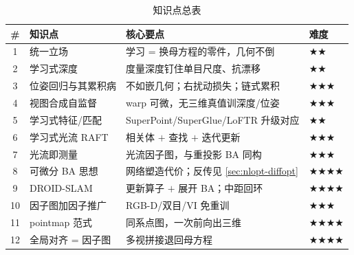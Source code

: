 \begin{table}[H]\centering\small
\caption{知识点总表}
\begin{tabular}{clll}
\toprule
\# & 知识点 & 核心要点 & 难度 \\
\midrule
1 & 统一立场 & 学习 = 换母方程的零件，几何不倒 & $\bigstar\bigstar$ \\
2 & 学习式深度 & 度量深度钉住单目尺度、抗漂移 & $\bigstar\bigstar$ \\
3 & 位姿回归与其累积病 & 不如嵌几何；右扰动损失；链式累积 & $\bigstar\bigstar\bigstar$ \\
4 & 视图合成自监督 & warp 可微，无三维真值训深度/位姿 & $\bigstar\bigstar\bigstar$ \\
5 & 学习式特征/匹配 & SuperPoint/SuperGlue/LoFTR 升级对应 & $\bigstar\bigstar$ \\
6 & 学习式光流 RAFT & 相关体 $+$ 查找 $+$ 迭代更新 & $\bigstar\bigstar\bigstar$ \\
7 & 光流即测量 & 光流因子图，与重投影 BA 同构 & $\bigstar\bigstar\bigstar$ \\
8 & 可微分 BA 思想 & 网络塑造代价；反传见 \cref{sec:nlopt-diffopt} & $\bigstar\bigstar\bigstar\bigstar$ \\
9 & DROID-SLAM & 更新算子 $+$ 展开 BA；中距回环 & $\bigstar\bigstar\bigstar\bigstar$ \\
10 & 因子图加因子推广 & RGB-D/双目/VI 免重训 & $\bigstar\bigstar\bigstar$ \\
11 & pointmap 范式 & 同系点图，一次前向出三维 & $\bigstar\bigstar\bigstar\bigstar$ \\
12 & 全局对齐 = 因子图 & 多视拼接退回母方程 & $\bigstar\bigstar\bigstar\bigstar$ \\
\bottomrule
\end{tabular}
\end{table}

